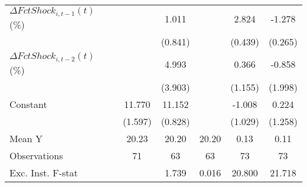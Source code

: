 {\begin{tabular}{l*{5}{c}}
\addlinespace
$ \Delta FctShock_{i,t-1}(t)$ (\%)&                     &       1.011         &                     &       2.824\sym{***}&      -1.278\sym{***}\\
                    &                     &     (0.841)         &                     &     (0.439)         &     (0.265)         \\
\addlinespace
$ \Delta FctShock_{i,t-2}(t)$ (\%)&                     &       4.993         &                     &       0.366         &      -0.858         \\
                    &                     &     (3.903)         &                     &     (1.155)         &     (1.998)         \\
\addlinespace
Constant            &      11.770\sym{***}&      11.152\sym{***}&                     &      -1.008         &       0.224         \\
                    &     (1.597)         &     (0.828)         &                     &     (1.029)         &     (1.258)         \\
\midrule
Mean Y              &       20.23         &       20.20         &       20.20         &        0.13         &        0.11         \\
Observations        &          71         &          63         &          63         &          73         &          73         \\
Exc. Inst. F-stat   &                     &       1.739         &       0.016         &      20.800         &      21.718         \\
\bottomrule
\end{tabular}
}
